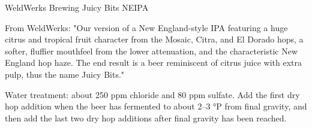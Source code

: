 \begin{recipie}{WeldWerks Brewing Juicy Bits NEIPA}

\begin{aboutblock}
From WeldWerks: "Our version of a New England-style IPA featuring a huge citrus
and tropical fruit character from the Mosaic, Citra, and El Dorado hops, a softer,
fluffier mouthfeel from the lower attenuation, and the characteristic New England
hop haze. The end result is a beer reminiscent of citrus juice with extra pulp,
thus the name Juicy Bits."
\end{aboutblock}


\begin{methodandtiming}
 
\begin{mashsteps}
\end{mashsteps}

\begin{fermentationsteps}
\end{fermentationsteps}

\begin{directions}
Water treatment: about 250 ppm chloride and 80 ppm sulfate. Add the first dry hop
addition when the beer has fermented to about 2--3 °P from final gravity,
and then add the last two dry hop additions after final gravity has been reached.
\end{directions}

\end{methodandtiming}

\pagebreak

\begin{ingredientsblock}

\begin{malts}
\end{malts}


\end{ingredientsblock}
\end{recipie}
